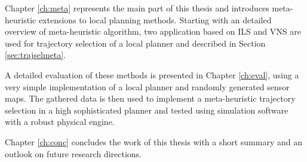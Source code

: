Chapter \ref{ch:meta} represents the main part of this thesis and introduces meta-heuristic extensions to local planning methods. 
Starting with an detailed overview of  meta-heuristic algorithm, two application based on ILS and VNS are used for trajectory selection of a local planner and described in Section \ref{sec:trajselmeta}.

A detailed evaluation of these methods is presented in Chapter \ref{ch:eval}, using a very simple implementation of a local planner and randomly generated sensor maps. 
The gathered data is then used to implement a meta-heuristic trajectory selection in a high sophisticated planner and tested using simulation software with a robust physical engine.

Chapter \ref{ch:conc} concludes the work of this thesis with a short summary and an outlook on future research directions.




